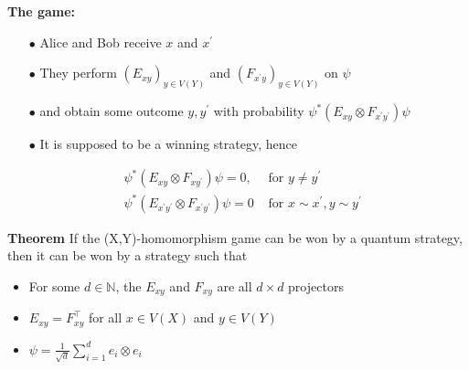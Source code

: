\documentclass[13.5pt]{beamer}
\begin{document}
\begin{frame}
\begin{block}{\color{colorblue}\textbf{The game:}}
\begin{itemize}
\item[$\bullet$] Alice and Bob receive $x$ and $x^\prime$ \pause
\item[$\bullet$] They perform $(E_{xy})_{y\in V(Y)}$ and $(F_{x^\prime y})_{y\in V(Y)}$ on $\psi$ \pause
\item[$\bullet$] and obtain some outcome $y, y^\prime$ with probability $\psi^* (E_{xy} \otimes F_{x^\prime y^\prime}) \psi$ \pause
\item[$\bullet$] It is supposed to be a winning strategy, hence
\end{itemize}
\end{block}
\begin{equation} 
\begin{array}{lrcl} 
& \psi^* (E_{xy} \otimes F_{x y^\prime}) \psi = 0, & \text{ for } y \ne y^\prime \\
& \psi^* (E_{x^\prime y^\prime} \otimes F_{x^\prime y^\prime}) \psi = 0 & \text{ for } x \sim x^\prime, y \sim y^\prime
\end{array} 
\end{equation}
\end{frame}

\begin{frame}
\begin{block}{\color{colorblue}\textbf{Theorem}}
\vspace{0.5cm}
If the (X,Y)-homomorphism game can be won by a quantum strategy, then it can be won by a strategy such that
\begin{itemize}
\item For some $d \in \mathbb{N}$, the $E_{xy}$ and $F_{xy}$ are all $d \times d$ projectors
\item $E_{xy}=F_{xy}^\top$ for all $x \in V(X)$ and $y \in V(Y)$
\item $\psi = \frac{1}{\sqrt{d}} \sum_{i=1}^d e_i \otimes e_i$
\end{itemize}
\end{block}
\end{frame}
\end{document}

